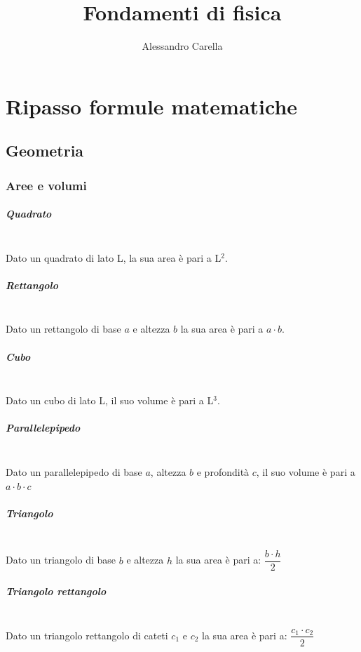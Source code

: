 \documentclass[12pt]{report}
\date{}
\author{Alessandro Carella}
\title{Fondamenti di fisica}
\begin{document}
	{
		\let\cleardoublepage\clearpage
		\maketitle
		\tableofcontents
	}
	\chapter{Ripasso formule matematiche}
	\section{Geometria}
	\subsection{Aree e volumi}
	\paragraph{Quadrato} \quad \\
	Dato un quadrato di lato L, la sua area è  pari a L$^2$.
	\paragraph{Rettangolo} \quad \\
	Dato un rettangolo di base $a$ e altezza $b$ la sua area è  pari a $a \cdot b$.
	\paragraph{Cubo} \quad \\
	Dato un cubo di lato L, il suo volume è  pari a L$^3$.
	\paragraph{Parallelepipedo} \quad \\
	Dato un parallelepipedo di base $a$, altezza $b$ e profondità $c$, il suo volume è  pari a $a \cdot b \cdot c$
	\paragraph{Triangolo} \quad \\
	Dato un triangolo di base $b$ e altezza $h$ la sua area è  pari a: $\dfrac{b \cdot h}{2}$
	\paragraph{Triangolo rettangolo} \quad \\
	Dato un triangolo rettangolo di cateti $c_1$ e $c_2$ la sua area è  pari a: $\dfrac{c_1 \cdot c_2}{2}$
\end{document}
